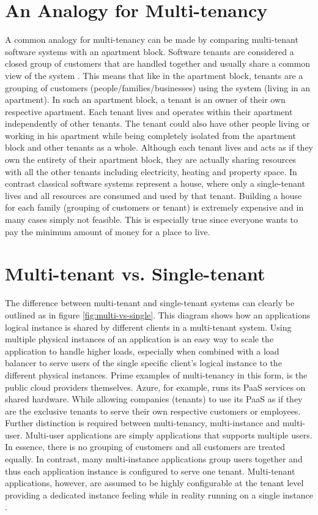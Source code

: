 \section{An Analogy for Multi-tenancy}

A common analogy for multi-tenancy can be made by comparing multi-tenant software systems with an apartment block. Software tenants are considered a closed group of customers that are handled together and usually share a common view of the system \cite{Krebs2012} \cite{Wilder2012-so}. This means that like in the apartment block, tenants are a grouping of customers (people/families/businesses) using the system (living in an apartment). In such an apartment block, a tenant is an owner of their own respective apartment. Each tenant lives and operates within their apartment independently of other tenants. The tenant could also have other people living or working in his apartment while being completely isolated from the apartment block and other tenants as a whole. Although each tenant lives and acts as if they own the entirety of their apartment block, they are actually sharing resources with all the other tenants including electricity, heating and property space. In contrast classical software systems represent a house, where only a single-tenant lives and all resources are consumed and used by that tenant. Building a house for each family (grouping of customers or tenant) is extremely expensive and in many cases simply not feasible. This is especially true since everyone wants to pay the minimum amount of money for a place to live.

\section{Multi-tenant vs. Single-tenant}

The difference between multi-tenant and single-tenant systems can clearly be outlined as in figure \ref{fig:multi-vs-single}. This diagram shows how an applications logical instance is shared by different clients in a multi-tenant system. Using multiple physical instances of an application is an easy way to scale the application to handle higher loads, especially when combined with a load balancer to serve users of the single specific client's logical instance to the different physical instances. Prime examples of multi-tenancy in this form, is the public cloud providers themselves. Azure, for example, runs its PaaS services on shared hardware. While allowing companies (tenants) to use its PaaS as if they are the exclusive tenants to serve their own respective customers or employees.
Further distinction is required between multi-tenancy, multi-instance  and multi-user. Multi-user applications are simply applications that supports multiple users. In essence, there is no grouping of customers and all customers are treated equally\cite{Bezemer:2010:MSA:1862372.1862393}. In contrast, many multi-instance applications group users together and thus each application instance is configured to serve one tenant. Multi-tenant applications, however, are assumed to be highly configurable at the tenant level providing a dedicated instance feeling while in reality running on a single instance \cite{Bezemer:2010:MSA:1862372.1862393}.

